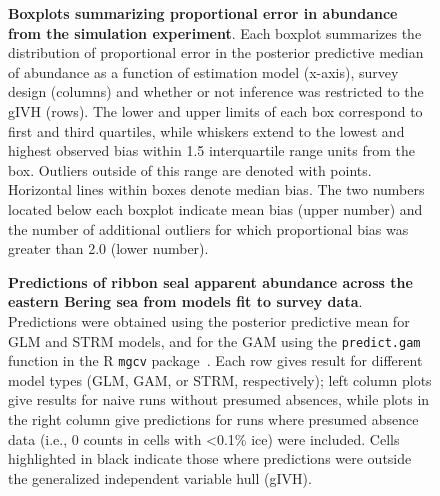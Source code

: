 \documentclass[10pt,letterpaper]{article}
\begin{document}
\begin{figure}[!h]
\caption{{\bf Boxplots summarizing proportional error in abundance from the simulation experiment}. Each boxplot summarizes the distribution of proportional error in the posterior predictive median of abundance as a function of estimation model (x-axis), survey design (columns) and whether or not inference was restricted to the gIVH (rows).  The lower and upper limits of each box correspond to first and third quartiles, while whiskers extend to the lowest and highest observed bias within 1.5 interquartile range units from the box.  Outliers outside of this range are denoted with points.  Horizontal lines within boxes denote median bias.  The two numbers located below each boxplot indicate mean bias (upper number) and the number of additional outliers for which proportional bias was greater than 2.0 (lower number). }
\label{fig:sim_boxplots}
\end{figure}


\begin{figure}[!h]
\caption{{\bf Predictions of ribbon seal apparent abundance across the eastern Bering sea from models fit to survey data}.  Predictions were obtained using the posterior predictive mean for GLM and STRM models, and for the GAM using the \texttt{predict.gam} function in the R \texttt{mgcv} package~\cite{Wood2006}. Each row gives result for different model types (GLM, GAM, or STRM, respectively); left column plots give results for naive runs without presumed absences, while plots in the right column give predictions for runs where presumed absence data (i.e., 0 counts in cells with \textless 0.1\% ice) were included. Cells highlighted in black indicate those where predictions were outside the generalized independent variable hull (gIVH). }
\label{fig:ribbon_plot}
\end{figure}
\end{document}
